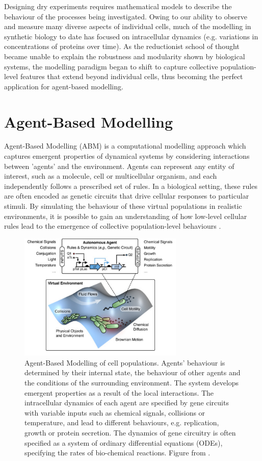 \documentclass[bsc,frontabs,singlespacing,parskip,deptreport]{infthesis}
\begin{document}
Designing dry experiments requires mathematical models to describe the behaviour of the processes being investigated. Owing to our ability to observe and measure many diverse aspects of individual cells, much of the modelling in synthetic biology to date has focused on intracellular dynamics (e.g. variations in concentrations of proteins over time). As the reductionist school of thought became unable to explain the robustness and modularity shown by biological systems, the modelling paradigm began to shift to capture collective population-level features that extend beyond individual cells, thus becoming the perfect application for agent-based modelling.

\section{Agent-Based Modelling}\label{sec:theory_abm}
Agent-Based Modelling (ABM) is a computational modelling approach which captures emergent properties of dynamical systems by considering interactions between 'agents' and the environment. Agents can represent any entity of interest, such as a molecule, cell or multicellular organism, and each independently follows a prescribed set of rules. In a biological setting, these rules are often encoded as genetic circuits that drive cellular responses to particular stimuli. By simulating the behaviour of these virtual populations in realistic environments, it is possible to gain an understanding of how low-level cellular rules lead to the emergence of collective population-level behaviours \cite{pmid27903820}.

\begin{figure}[h]
    \centering
    \includegraphics[width=0.7\textwidth]{Images/Other/abm.pdf}
    \caption{Agent-Based Modelling of cell populations. Agents' behaviour is determined by their internal state, the behaviour of other agents and the conditions of the surrounding environment. The system develops emergent properties as a result of the local interactions. The intracellular dynamics of each agent are specified by gene circuits with variable inputs such as chemical signals, collisions or temperature, and lead to different behaviours, e.g. replication, growth or protein secretion. The dynamics of gene circuitry is often specified as a system of ordinary differential equations (ODEs), specifying the rates of bio-chemical reactions. Figure from \cite{pmid27903820}. }
    \label{fig:abm}
\end{figure}
\end{document}
